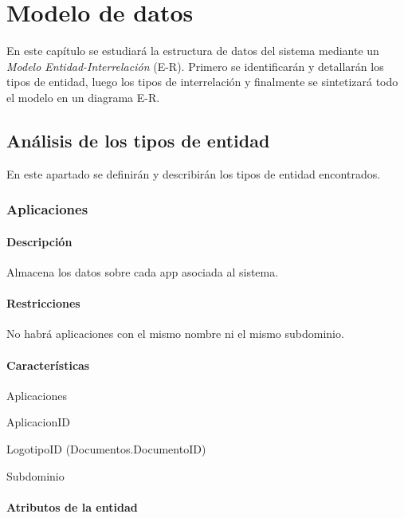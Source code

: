 \chapter{Modelo de datos}
En este capítulo se estudiará la estructura de datos del sistema mediante un \textit{Modelo Entidad-Interrelación} (E-R).
Primero se identificarán y detallarán los tipos de entidad, luego los tipos de interrelación y finalmente se sintetizará todo el modelo en un diagrama E-R.

\section {Análisis de los tipos de entidad}
En este apartado se definirán y describirán los tipos de entidad encontrados. 

\subsection{Aplicaciones}
\subsubsection*{Descripción}
Almacena los datos sobre cada app asociada al sistema.
\subsubsection*{Restricciones}
No habrá aplicaciones con el mismo nombre ni el mismo subdominio.
\subsubsection*{Características}
\begin{description}[nosep,style=multiline,labelindent=0.8cm,leftmargin=5.5cm,font=\normalfont]
    \item[Nombre] Aplicaciones
    \item[Identificador principal] AplicacionID
    \item[Atributos heredados] LogotipoID (Documentos.DocumentoID)
    \item[Identificador alternativo] Subdominio
\end{description}

\subsubsection*{Atributos de la entidad}

